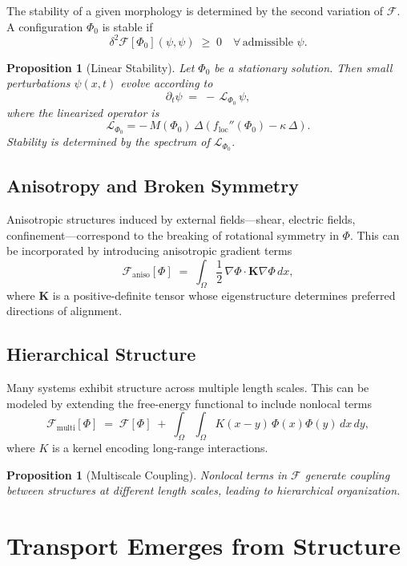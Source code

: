 \documentclass[11pt, a4paper, twocolumn]{article}
\newtheorem{proposition}[definition]{Proposition}
\newcommand{\F}{\mathcal{F}}
\begin{document}
The stability of a given morphology is determined by the second variation of
$\F$. A configuration $\Phi_0$ is stable if
\[
    \delta^2 \F[\Phi_0](\psi,\psi) \;\geq\; 0
    \quad \forall\,\text{admissible } \psi.
\]

\begin{proposition}[Linear Stability]
Let $\Phi_0$ be a stationary solution. Then small perturbations
$\psi(x,t)$ evolve according to
\[
    \partial_t \psi \;=\;
    -\,\mathcal{L}_{\Phi_0}\,\psi,
\]
where the linearized operator is
\[
    \mathcal{L}_{\Phi_0} =
    -\,M(\Phi_0)\,\Delta
    \left(
        f_{\mathrm{loc}}''(\Phi_0)
        - \kappa\,\Delta
    \right).
\]
Stability is determined by the spectrum of $\mathcal{L}_{\Phi_0}$.
\end{proposition}

\subsection{Anisotropy and Broken Symmetry}

Anisotropic structures induced by external fields---shear, electric fields,
confinement---correspond to the breaking of rotational symmetry in $\Phi$.
This can be incorporated by introducing anisotropic gradient terms
\[
    \F_{\mathrm{aniso}}[\Phi]
    \;=\;
    \int_{\Omega}
    \frac{1}{2}\,\nabla \Phi \cdot \mathbf{K} \nabla \Phi \, dx,
\]
where $\mathbf{K}$ is a positive-definite tensor whose eigenstructure
determines preferred directions of alignment.

\subsection{Hierarchical Structure}

Many systems exhibit structure across multiple length scales. This can be
modeled by extending the free-energy functional to include nonlocal terms
\[
    \F_{\mathrm{multi}}[\Phi]
    \;=\;
    \F[\Phi]
    \;+\;
    \int_{\Omega} \int_{\Omega}
    K(x-y)\,\Phi(x)\Phi(y)\,dx\,dy,
\]
where $K$ is a kernel encoding long-range interactions.

\begin{proposition}[Multiscale Coupling]
Nonlocal terms in $\F$ generate coupling between structures at different
length scales, leading to hierarchical organization.
\end{proposition}

\section{Transport Emerges from Structure}
\end{document}
